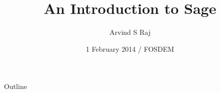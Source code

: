 \documentclass{beamer}
\title{An Introduction to Sage}
\author[Arvind]
{Arvind S Raj}
\institute[Amrita]
{
  Department of Cybersecurity Systems and Networks\\
  Amrita University, India
}
\date[FOSDEM 2014] %
{1 February 2014 / FOSDEM}
\begin{document}
\begin{frame}
  \titlepage
\end{frame}

\begin{frame}{Outline}
  \tableofcontents
\end{frame}
\end{document}
